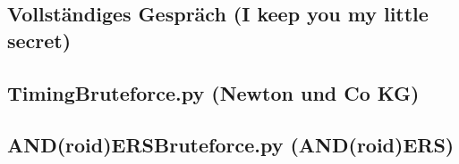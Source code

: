 \documentclass[12pt, a4paper, titlepage, oneside]{scrartcl}
\begin{document}
	\subsection{Vollständiges Gespräch (I keep you my little secret)}
	

	\subsection{TimingBruteforce.py (Newton und Co KG)}
	

    \subsection{AND(roid)ERSBruteforce.py (AND(roid)ERS)}
    

\end{document}
